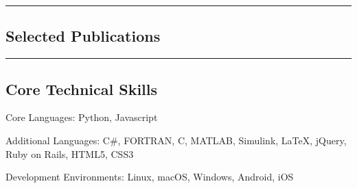 \documentclass[10pt,letterpaper]{article}
\newenvironment{indentsection}[1]%
{\begin{list}{}%
	{\setlength{\leftmargin}{#1}}%
	\item[]%
}
{\end{list}}
\newcommand{\CPP}
{C\nolinebreak[4]\hspace{-.05em}\raisebox{.22ex}{\footnotesize\bf ++}}
\begin{document}
\hrule
\vspace{-0.4em}
\subsection*{Selected Publications}

\nocite{*}
\renewcommand{\section}[2]{}%


\hrule
\vspace{-0.4em}
\subsection*{Core Technical Skills}

\begin{indentsection}{\parindent}
	\begin{description*}
		\item[Core Languages:]
		Python, Javascript
		\item[Additional Languages:]
		C\#, FORTRAN, \CPP, MATLAB, Simulink, \LaTeX, jQuery, Ruby on Rails, HTML5, CSS3
		\item[Development Environments:]
		Linux, macOS, Windows, Android, iOS
	\end{description*}
\end{indentsection}
\end{document}
